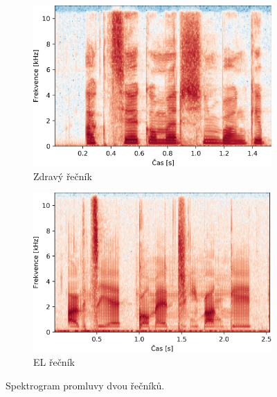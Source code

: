 \begin{figure}[htpb]
  \centering
  \begin{subfigure}[b]{0.4\textwidth}
    \includegraphics[width=\textwidth]{./ch5-construction/img/spectrogram_normal.png}
    \caption{Zdravý řečník}
    \label{fig:construction:spectrogram:normal}
  \end{subfigure}
  \begin{subfigure}[b]{0.4\textwidth}
    \includegraphics[width=\textwidth]{./ch5-construction/img/spectrogram_el.png}
    \caption{EL řečník}
    \label{fig:construction:spectrogram:el}
  \end{subfigure}
  \caption{Spektrogram promluvy  dvou řečníků.}
  \label{fig:construction:spectrogram}
\end{figure}

